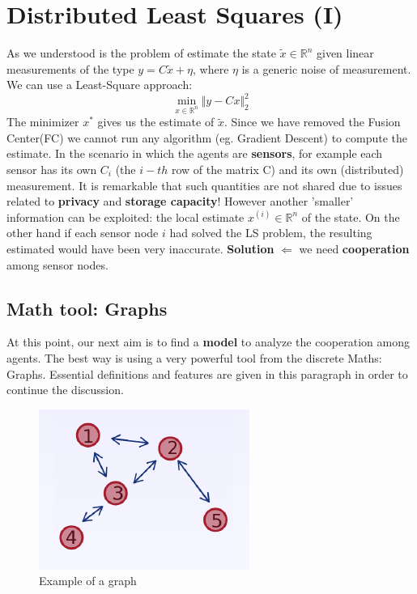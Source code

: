 \section{Distributed Least Squares (I)}
As we understood is the problem of estimate the state $\tilde{x}\in \mathbb{R}^n$ given linear measurements of the type $y=C\tilde{x}+\eta$, where $\eta$ is a generic noise of measurement. We can use a Least-Square approach:
\begin{equation}
    \min_{x \in \mathbb{R}^n} \Vert y-Cx \Vert_2^2
\end{equation}
The minimizer $x^*$ gives us the estimate of $\tilde{x}$. Since we have removed the Fusion Center(FC) we cannot run any algorithm (eg. Gradient Descent) to compute the estimate. In the scenario in which the agents are \textbf{sensors}, for example each sensor has its own $C_i$ (the $i-th$ row of the matrix C) and its own (distributed) measurement. It is remarkable that such quantities are not shared due to issues related to \textbf{privacy} and \textbf{storage capacity}! However another 'smaller' information can be exploited: the local estimate $x^{(i)} \in \mathbb{R}^n$ of the state. On the other hand if each sensor node $i$ had solved the LS problem, the resulting estimated would have been very inaccurate. \textbf{Solution} $\Leftarrow$ we need \textbf{cooperation} among sensor nodes.

\subsection*{Math tool: Graphs}
At this point, our next aim is to find a \textbf{model} to analyze the cooperation among agents. The best way is using a very powerful tool from the discrete Maths: Graphs. Essential definitions and features are given in this paragraph in order to continue the discussion. 
\begin{figure}[h]
    \centering
    \includegraphics[scale=1.2]{images/Graph.png}
    \caption{Example of a graph}    
\end{figure}

